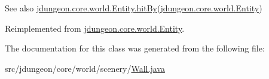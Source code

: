 \begin{DoxySeeAlso}{See also}
\hyperlink{classjdungeon_1_1core_1_1world_1_1_entity_ab1416ea34d958af08b0712eff91c7982}{jdungeon.core.world.Entity.hitBy}(\hyperlink{classjdungeon_1_1core_1_1world_1_1_entity}{jdungeon.core.world.Entity}) 
\end{DoxySeeAlso}


Reimplemented from \hyperlink{classjdungeon_1_1core_1_1world_1_1_entity_ab1416ea34d958af08b0712eff91c7982}{jdungeon.core.world.Entity}.



The documentation for this class was generated from the following file:\begin{DoxyCompactItemize}
\item 
src/jdungeon/core/world/scenery/\hyperlink{_wall_8java}{Wall.java}\end{DoxyCompactItemize}
